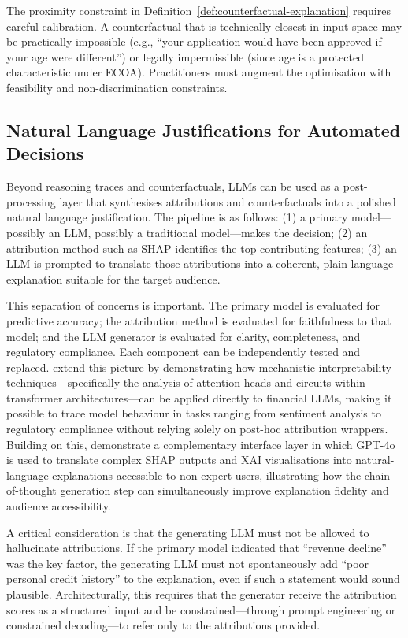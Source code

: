 \begin{remark}
The proximity constraint in Definition~\ref{def:counterfactual-explanation} requires
careful calibration. A counterfactual that is technically closest in input space may be
practically impossible (e.g., ``your application would have been approved if your age
were different'') or legally impermissible (since age is a protected characteristic
under ECOA). Practitioners must augment the optimisation with feasibility and
non-discrimination constraints.
\end{remark}

\subsection{Natural Language Justifications for Automated Decisions}
\label{sec:ch12-nl-justifications}

Beyond reasoning traces and counterfactuals, LLMs can be used as a post-processing layer
that synthesises attributions and counterfactuals into a polished natural language
justification. The pipeline is as follows: (1) a primary model---possibly an LLM,
possibly a traditional model---makes the decision; (2) an attribution method such as SHAP
identifies the top contributing features; (3) an LLM is prompted to translate those
attributions into a coherent, plain-language explanation suitable for the target audience.

This separation of concerns is important. The primary model is evaluated for predictive
accuracy; the attribution method is evaluated for faithfulness to that model; and the
LLM generator is evaluated for clarity, completeness, and regulatory compliance. Each
component can be independently tested and replaced. \citet{TatsatShater2025} extend this picture by demonstrating how mechanistic
interpretability techniques---specifically the analysis of attention heads and circuits
within transformer architectures---can be applied directly to financial LLMs, making
it possible to trace model behaviour in tasks ranging from sentiment analysis to
regulatory compliance without relying solely on post-hoc attribution wrappers. Building
on this, \citet{CetintavEtAl2024} demonstrate a complementary
interface layer in which GPT-4o is used to translate complex SHAP outputs and XAI
visualisations into natural-language explanations accessible to non-expert users,
illustrating how the chain-of-thought generation step can simultaneously improve
explanation fidelity and audience accessibility.

A critical consideration is that the generating LLM must not be allowed to hallucinate
attributions. If the primary model indicated that ``revenue decline'' was the key factor,
the generating LLM must not spontaneously add ``poor personal credit history'' to the
explanation, even if such a statement would sound plausible. Architecturally, this
requires that the generator receive the attribution scores as a structured input and be
constrained---through prompt engineering or constrained decoding---to refer only to the
attributions provided.


